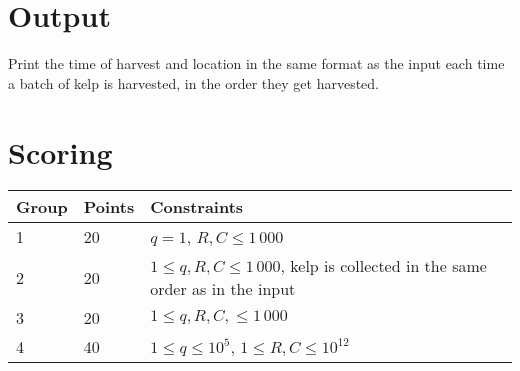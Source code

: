 \section*{Output}
Print the time of harvest and location in the same format as the input each time
a batch of kelp is harvested, in the order they get harvested.

\section*{Scoring}
\begin{tabular}{|l|l|l|}
\hline
Group & Points & Constraints \\ \hline
1     & 20   & $q = 1$, $R, C \leq 1\,000$ \\ \hline
2     & 20   & $1 \leq q, R, C \leq 1\,000$, kelp is collected in the same order as in the input \\ \hline
3     & 20   & $1 \leq q, R, C, \leq 1\,000$ \\ \hline
4     & 40   & $1 \leq q \leq 10^5$, $1 \leq R, C \leq 10^{12}$ \\ \hline
\end{tabular}

